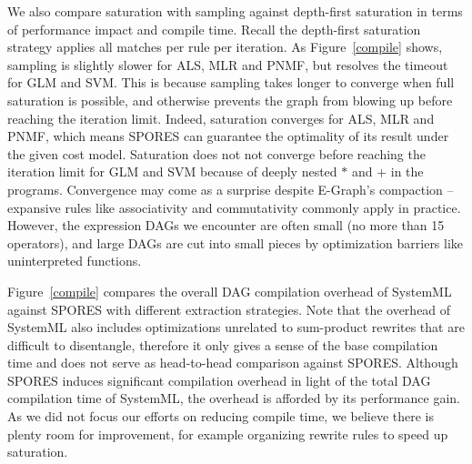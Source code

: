 We also compare saturation with sampling against depth-first saturation in terms of
performance impact and compile time. Recall the depth-first saturation strategy
applies all matches per rule per iteration. As Figure~\ref{compile} shows,
sampling is slightly slower for ALS, MLR and PNMF, but resolves the timeout for 
GLM and SVM. This is because sampling takes longer to converge when full
saturation is possible, and otherwise prevents the graph from blowing up before
reaching the iteration limit.
Indeed, saturation converges for ALS, MLR and PNMF, which means SPORES
can guarantee the optimality of its result under the given cost model. Saturation
does not not converge before reaching the iteration limit for GLM and SVM because
of deeply nested $*$ and $+$ in the programs. 
Convergence
may come as a surprise despite E-Graph's compaction -- expansive rules like
associativity and commutativity commonly apply in practice. However, the expression
DAGs we encounter are often small (no more than 15 operators), and large DAGs
are cut into small pieces by optimization barriers like uninterpreted functions. 

Figure~\ref{compile} compares the overall DAG compilation overhead of SystemML
against SPORES with different extraction strategies.
Note that the overhead of SystemML also includes optimizations unrelated to sum-product rewrites that are difficult to disentangle, therefore it only gives a sense of the base compilation time and does not serve as head-to-head comparison against SPORES. 
Although SPORES induces significant compilation overhead in light of the total DAG compilation time of SystemML, the overhead is afforded by
its performance gain. As we did not focus our efforts on
reducing compile time, we believe there is plenty room for improvement, for
example organizing rewrite rules to speed up saturation.

